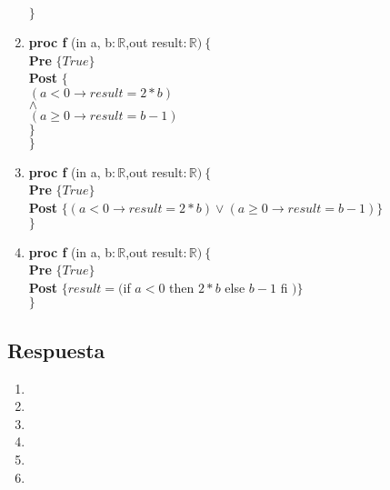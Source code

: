 \documentclass[a4paper]{article}
\begin{document}
\begin{enumerate}[label=\alph*)]
			$\}$
		\item
			\textbf{proc f }(in a, b$: \mathbb{R}$,out result$:\mathbb{R})\ \{$\smallskip \\
			\hspace*{6mm} \textbf{Pre }$\{ True\}$\smallskip \\
			\hspace*{6mm} \textbf{Post }$\{$\\
			\hspace*{6mm} $(a < 0 \rightarrow result=2*b)$\\
			\hspace*{6mm} $\wedge$\\
			\hspace*{6mm} $(a \geq 0 \rightarrow result=b-1)$\\			
			\hspace*{6mm}$\}$\\
			$\}$
		\item
			\textbf{proc f }(in a, b$: \mathbb{R}$,out result$:\mathbb{R})\ \{$\smallskip \\
			\hspace*{6mm} \textbf{Pre }$\{ True\}$\smallskip \\
			\hspace*{6mm} \textbf{Post }$\{(a<0\rightarrow result=2*b)\vee (
				a\geq 0 \rightarrow result = b-1)\}$\\
			$\}$
		\item
			\textbf{proc f }(in a, b$: \mathbb{R}$,out result$:\mathbb{R})\ \{$\smallskip \\
			\hspace*{6mm} \textbf{Pre }$\{ True\}$\smallskip \\
			\hspace*{6mm} \textbf{Post }$\{result=($if $ a<0$ then $2*b$ else $b-1$ fi $)\}$\\
			$\}$
	\end{enumerate}
\subsection*{Respuesta}
	\begin{enumerate}[label=\alph*)]
		\item
		\item
		\item
		\item
		\item
		\item
	\end{enumerate}
\end{document}
